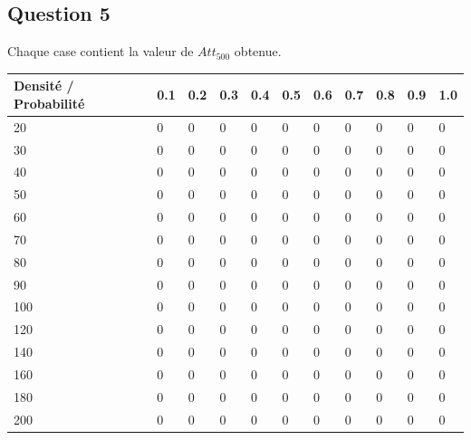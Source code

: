 \documentclass[10pt]{report}
\begin{document}
\subsection{Question 5}
Chaque case contient la valeur de $Att_{500}$ obtenue.\newline
\begin{center}
\captionsetup{type=figure}
\begin{tabular}{|l|l|l|l|l|l|l|l|l|l|l|} \hline
  	Densité / Probabilité & 0.1 & 0.2 & 0.3 & 0.4 & 0.5 & 0.6 & 0.7 & 0.8 & 0.9 & 1.0\\ \hline
	20 & 0 & 0 & 0 & 0 & 0 & 0 & 0 & 0 & 0 & 0 \\ \hline
  	30 & 0 & 0 & 0 & 0 & 0 & 0 & 0 & 0 & 0 & 0 \\ \hline
  	40 & 0 & 0 & 0 & 0 & 0 & 0 & 0 & 0 & 0 & 0 \\ \hline
  	50 & 0 & 0 & 0 & 0 & 0 & 0 & 0 & 0 & 0 & 0 \\ \hline
  	60 & 0 & 0 & 0 & 0 & 0 & 0 & 0 & 0 & 0 & 0 \\ \hline
  	70 & 0 & 0 & 0 & 0 & 0 & 0 & 0 & 0 & 0 & 0 \\ \hline
    80 & 0 & 0 & 0 & 0 & 0 & 0 & 0 & 0 & 0 & 0 \\ \hline
  	90 & 0 & 0 & 0 & 0 & 0 & 0 & 0 & 0 & 0 & 0 \\ \hline
  	100 & 0 & 0 & 0 & 0 & 0 & 0 & 0 & 0 & 0 & 0 \\ \hline
  	120 & 0 & 0 & 0 & 0 & 0 & 0 & 0 & 0 & 0 & 0 \\ \hline
  	140 & 0 & 0 & 0 & 0 & 0 & 0 & 0 & 0 & 0 & 0 \\ \hline
  	160 & 0 & 0 & 0 & 0 & 0 & 0 & 0 & 0 & 0 & 0 \\ \hline
  	180 & 0 & 0 & 0 & 0 & 0 & 0 & 0 & 0 & 0 & 0 \\ \hline
  	200 & 0 & 0 & 0 & 0 & 0 & 0 & 0 & 0 & 0 & 0 \\ \hline
\end{tabular}
\end{center}
\end{document}
